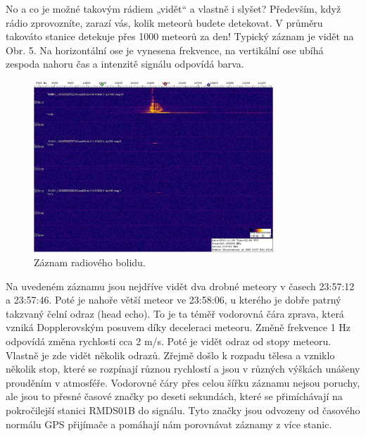 \documentclass[10pt,a5paper,twoside]{book}
\begin{document}
No a co je možné takovým rádiem „vidět“ a vlastně i slyšet? Především, když rádio zprovozníte, zarazí vás, kolik meteorů budete detekovat. V průměru takováto stanice detekuje přes 1000 meteorů za den! Typický záznam je vidět na Obr. 5. Na horizontální ose je vynesena frekvence, na vertikální ose ubíhá zespoda nahoru čas a intenzitě signálu odpovídá barva.
\begin{figure}[htbp]
	\begin{center}
		\includegraphics[width=9cm]{graves/graves_soubory/image007.eps}
	  	\caption{Záznam radiového bolidu.}
	  	\label{fig:}
	\end{center}
\end{figure}
Na uvedeném záznamu jsou nejdříve vidět dva drobné meteory v časech 23:57:12 a 23:57:46. Poté je nahoře větší meteor ve 23:58:06, u kterého je dobře patrný takzvaný čelní odraz (head echo). To je ta téměř vodorovná čára zprava, která vzniká Dopplerovským posuvem díky deceleraci meteoru. Změně frekvence 1 Hz odpovídá změna rychlosti cca 2 m/s. Poté je vidět odraz od stopy meteoru. Vlastně je zde vidět několik odrazů. Zřejmě došlo k rozpadu tělesa a vzniklo několik stop, které se rozpínají různou rychlostí a jsou v různých výškách unášeny prouděním v atmosféře. Vodorovné čáry přes celou šířku záznamu nejsou poruchy, ale jsou to přesné časové značky po deseti sekundách, které se přimíchávají na pokročilejší stanici RMDS01B do signálu. Tyto značky jsou odvozeny od časového normálu GPS přijímače a pomáhají nám porovnávat záznamy z více stanic.
\end{document}
